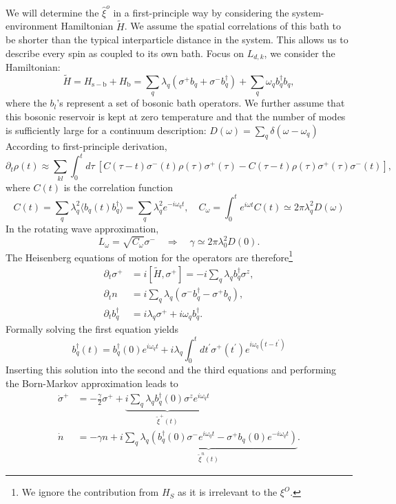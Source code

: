 \documentclass{SciPost}
\begin{document}
We will determine the $\hat\xi^o$ in a first-principle way by considering the system-environment Hamiltonian $\tilde H$.
We assume the spatial correlations of this bath to be shorter than the typical interparticle distance in the system. This allows us to describe every spin as coupled to its own bath. 
Focus on $L_{d,k}$, we consider the Hamiltonian:
\begin{equation}
	\widetilde{H} = H_{\mathrm{s}-\mathrm{b}}+H_{\mathrm{b}}
	= \sum_q \lambda_q\left(\sigma^{+} b_q+ \sigma^{-}b_q^{\dagger} \right)+\sum_q \omega_q b_q^{\dagger} b_q,
\end{equation}
where the $b_l$'s represent a set of bosonic bath operators.
We further assume that this bosonic reservoir is kept at zero temperature and that the number of modes is sufficiently large for a continuum description: $D(\omega)=\sum_q \delta(\omega-\omega_q)$
According to first-principle derivation, 
\begin{equation*}
	\partial_t \rho(t)
	\approx \sum_{kl}\int_0^t d\tau\ \left[C(\tau - t) \sigma^-(t)\rho(\tau)\sigma^+(\tau) -  C(\tau - t)\rho(\tau)\sigma^+(\tau)\sigma^-(t)\right],
\end{equation*}
where $C(t)$ is the correlation function
\begin{equation}
	C(t) = \sum_q \lambda_q^2 \langle b_q(t) b_q^\dagger\rangle = \sum_q \lambda_q^2 e^{-i\omega_q t},\quad
	C_\omega = \int_0^t e^{i\omega t} C(t) \simeq 2\pi \lambda_q^2 D(\omega)
\end{equation}
In the rotating wave approximation,
\begin{equation}
	L_\omega = \sqrt{C_\omega} \sigma^- \quad\Longrightarrow\quad
	\gamma \simeq 2\pi \lambda_0^2 D(0).
\end{equation}
The Heisenberg equations of motion for the operators are therefore\footnote{We ignore the contribution from $H_S$ as it is irrelevant to the $\xi^O$.}
\begin{equation}
\begin{aligned}
	\partial_t\sigma^{+} & =i\left[\widetilde{H}, \sigma^{+}\right]=-i \sum_q \lambda_q b_q^{\dagger} \sigma^z, \\
	\partial_t n & =i \sum_q \lambda_q\left(\sigma^{-}b_q^{\dagger}-\sigma^{+} b_q\right), \\
	\partial_t b_q^{\dagger} & =i \lambda_q \sigma^{+}+i \omega_q b_q^{\dagger} .
\end{aligned}
\end{equation}
Formally solving the first equation yields
$$
b_q^{\dagger}(t)=b_q^{\dagger}(0) e^{i \omega_q t}+i \lambda_q \int_0^t d t^{\prime} \sigma^{+}(t^{\prime}) e^{i \omega_q(t-t^{\prime})}
$$
Inserting this solution into the second and the third equations and performing the Born-Markov approximation leads to
$$
\begin{aligned}
\dot{\sigma}^{+} & =-\frac{\gamma}{2} \sigma^{+}+\underbrace{i \sum_q \lambda_q b_q^{\dagger}(0) \sigma^z e^{i \omega_q t}}_{\tilde{\xi}^{+}(t)} \\
\dot{n} & =-\gamma n+\underbrace{i \sum_q \lambda_q\left(b_q^{\dagger}(0) \sigma^{-} e^{i \omega_q t}-\sigma^{+} b_q(0) e^{-i \omega_q t}\right)}_{\tilde{\xi}^n(t)} .
\end{aligned}
$$


%

\end{document}
